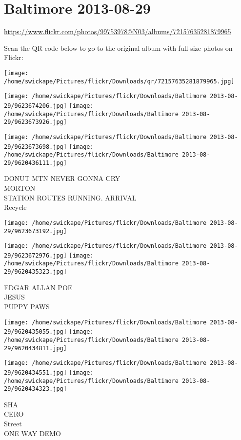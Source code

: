 \documentclass[10pt,letterpaper]{article}
\title{}
\author{}
\date{}
\begin{document}
\section*{Baltimore 2013-08-29}

\url{https://www.flickr.com/photos/99753978@N03/albums/72157635281879965}

Scan the QR code below to go to the original album with full-size photos on Flickr:

\texttt{[image: /home/swickape/Pictures/flickr/Downloads/qr/72157635281879965.jpg]}
\pagebreak

\texttt{[image: /home/swickape/Pictures/flickr/Downloads/Baltimore 2013-08-29/9623674206.jpg]}
\texttt{[image: /home/swickape/Pictures/flickr/Downloads/Baltimore 2013-08-29/9623673926.jpg]}

\texttt{[image: /home/swickape/Pictures/flickr/Downloads/Baltimore 2013-08-29/9623673698.jpg]}
\texttt{[image: /home/swickape/Pictures/flickr/Downloads/Baltimore 2013-08-29/9620436111.jpg]}

DONUT MTN NEVER GONNA CRY\\
MORTON\\
STATION ROUTES RUNNING. ARRIVAL\\
Recycle
\pagebreak

\texttt{[image: /home/swickape/Pictures/flickr/Downloads/Baltimore 2013-08-29/9623673192.jpg]}

\vspace{0.25in}
\texttt{[image: /home/swickape/Pictures/flickr/Downloads/Baltimore 2013-08-29/9623672976.jpg]}
\texttt{[image: /home/swickape/Pictures/flickr/Downloads/Baltimore 2013-08-29/9620435323.jpg]}

EDGAR ALLAN POE\\
JESUS\\
PUPPY PAWS
\pagebreak

\texttt{[image: /home/swickape/Pictures/flickr/Downloads/Baltimore 2013-08-29/9620435055.jpg]}
\texttt{[image: /home/swickape/Pictures/flickr/Downloads/Baltimore 2013-08-29/9620434811.jpg]}

\texttt{[image: /home/swickape/Pictures/flickr/Downloads/Baltimore 2013-08-29/9620434551.jpg]}
\texttt{[image: /home/swickape/Pictures/flickr/Downloads/Baltimore 2013-08-29/9620434323.jpg]}

SHA\\
CERO\\
Street\\
ONE WAY DEMO
\pagebreak
\end{document}
